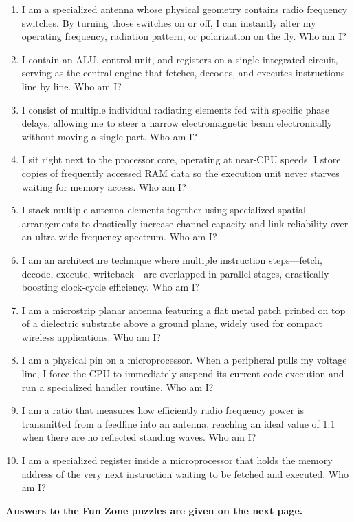 \vspace{0.7em}
\begin{tcolorbox}[
  colback=black!2,
  colframe=IEEEblue!75!black,
  boxrule=0.6pt,
  arc=0mm,
  left=5mm,
  right=5mm,
  top=4mm,
  bottom=4mm
]
  \small
  \begin{enumerate}[leftmargin=2.1em,itemsep=0.75em,topsep=0pt,parsep=0pt]
    \item I am a specialized antenna whose physical geometry contains radio frequency switches. By turning those switches on or off, I can instantly alter my operating frequency, radiation pattern, or polarization on the fly. Who am I?

    \item I contain an ALU, control unit, and registers on a single integrated circuit, serving as the central engine that fetches, decodes, and executes instructions line by line. Who am I?

    \item I consist of multiple individual radiating elements fed with specific phase delays, allowing me to steer a narrow electromagnetic beam electronically without moving a single part. Who am I?

    \item I sit right next to the processor core, operating at near-CPU speeds. I store copies of frequently accessed RAM data so the execution unit never starves waiting for memory access. Who am I?

    \item I stack multiple antenna elements together using specialized spatial arrangements to drastically increase channel capacity and link reliability over an ultra-wide frequency spectrum. Who am I?

    \item I am an architecture technique where multiple instruction steps---fetch, decode, execute, writeback---are overlapped in parallel stages, drastically boosting clock-cycle efficiency. Who am I?

    \item I am a microstrip planar antenna featuring a flat metal patch printed on top of a dielectric substrate above a ground plane, widely used for compact wireless applications. Who am I?

    \item I am a physical pin on a microprocessor. When a peripheral pulls my voltage line, I force the CPU to immediately suspend its current code execution and run a specialized handler routine. Who am I?

    \item I am a ratio that measures how efficiently radio frequency power is transmitted from a feedline into an antenna, reaching an ideal value of 1:1 when there are no reflected standing waves. Who am I?

    \item I am a specialized register inside a microprocessor that holds the memory address of the very next instruction waiting to be fetched and executed. Who am I?
  \end{enumerate}
\end{tcolorbox}

\vfill
\begin{center}
  {\small\bfseries\rmfamily\color{IEEEblue}
  Answers to the Fun Zone puzzles are given on the next page.\par}
\end{center}
